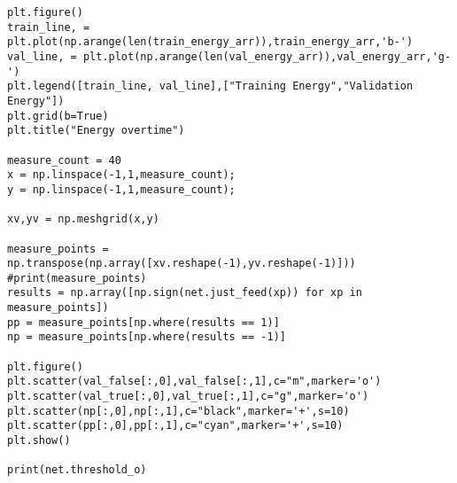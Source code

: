 \documentclass{article}
\begin{document}
\begin{verbatim}
plt.figure()
train_line, = plt.plot(np.arange(len(train_energy_arr)),train_energy_arr,'b-')
val_line, = plt.plot(np.arange(len(val_energy_arr)),val_energy_arr,'g-')
plt.legend([train_line, val_line],["Training Energy","Validation Energy"])
plt.grid(b=True)
plt.title("Energy overtime")

measure_count = 40
x = np.linspace(-1,1,measure_count);
y = np.linspace(-1,1,measure_count);

xv,yv = np.meshgrid(x,y)

measure_points = np.transpose(np.array([xv.reshape(-1),yv.reshape(-1)])) 
#print(measure_points)
results = np.array([np.sign(net.just_feed(xp)) for xp in measure_points])
pp = measure_points[np.where(results == 1)]
np = measure_points[np.where(results == -1)]

plt.figure()
plt.scatter(val_false[:,0],val_false[:,1],c="m",marker='o')
plt.scatter(val_true[:,0],val_true[:,1],c="g",marker='o')
plt.scatter(np[:,0],np[:,1],c="black",marker='+',s=10)
plt.scatter(pp[:,0],pp[:,1],c="cyan",marker='+',s=10)
plt.show()

print(net.threshold_o)

\end{verbatim}
\end{document}
